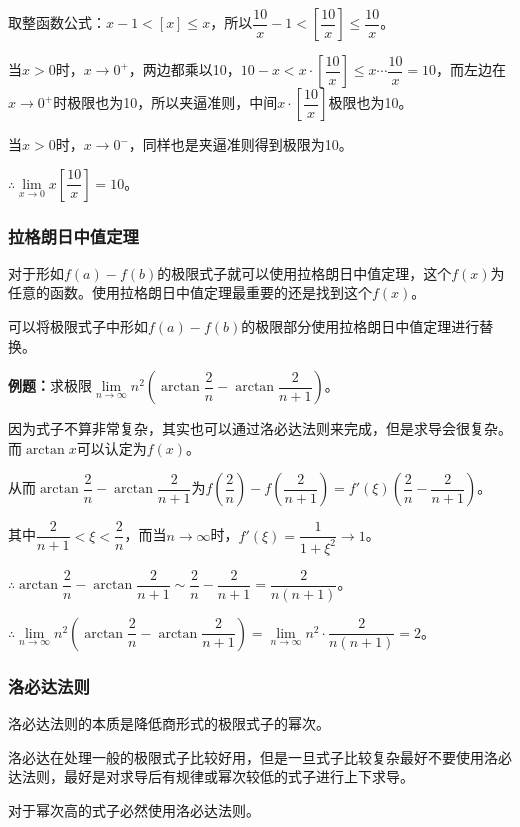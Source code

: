 \documentclass[UTF8, 12pt]{ctexart}
\begin{document}
取整函数公式：$x-1<[x]\leqslant x$，所以$\dfrac{10}{x}-1<\left[\dfrac{10}{x}\right]\leqslant\dfrac{10}{x}$。

当$x>0$时，$x\to 0^+$，两边都乘以10，$10-x<x\cdot\left[\dfrac{10}{x}\right]\leqslant x\cdots\dfrac{10}{x}=10$，而左边在$x\to 0^+$时极限也为10，所以夹逼准则，中间$x\cdot\left[\dfrac{10}{x}\right]$极限也为10。\medskip

当$x>0$时，$x\to 0^-$，同样也是夹逼准则得到极限为10。\medskip

$\therefore \lim\limits_{x\to 0}x\left[\dfrac{10}{x}\right]=10$。

\subsubsection{拉格朗日中值定理}

对于形如$f(a)-f(b)$的极限式子就可以使用拉格朗日中值定理，这个$f(x)$为任意的函数。使用拉格朗日中值定理最重要的还是找到这个$f(x)$。

可以将极限式子中形如$f(a)-f(b)$的极限部分使用拉格朗日中值定理进行替换。

\textbf{例题：}求极限$\lim\limits_{n\to\infty}n^2\left(\arctan\dfrac{2}{n}-\arctan\dfrac{2}{n+1}\right)$。\medskip

因为式子不算非常复杂，其实也可以通过洛必达法则来完成，但是求导会很复杂。而$\arctan x$可以认定为$f(x)$。

从而$\arctan\dfrac{2}{n}-\arctan\dfrac{2}{n+1}$为$f(\dfrac{2}{n})-f(\dfrac{2}{n+1})=f'(\xi)\left(\dfrac{2}{n}-\dfrac{2}{n+1}\right)$。

其中$\dfrac{2}{n+1}<\xi<\dfrac{2}{n}$，而当$n\to\infty$时，$f'(\xi)=\dfrac{1}{1+\xi^2}\to 1$。

$\therefore\arctan\dfrac{2}{n}-\arctan\dfrac{2}{n+1}\sim\dfrac{2}{n}-\dfrac{2}{n+1}=\dfrac{2}{n(n+1)}$。

$\therefore\lim\limits_{n\to\infty}n^2\left(\arctan\dfrac{2}{n}-\arctan\dfrac{2}{n+1}\right)=\lim\limits_{n\to\infty}n^2\cdot\dfrac{2}{n(n+1)}=2$。

\subsubsection{洛必达法则}

洛必达法则的本质是降低商形式的极限式子的幂次。

洛必达在处理一般的极限式子比较好用，但是一旦式子比较复杂最好不要使用洛必达法则，最好是对求导后有规律或幂次较低的式子进行上下求导。

对于幂次高的式子必然使用洛必达法则。
\end{document}
